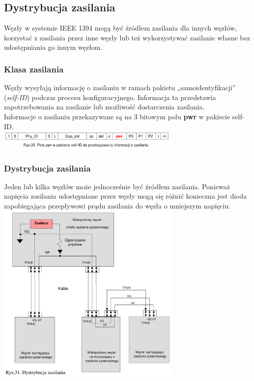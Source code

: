 \subsection{Dystrybucja zasilania}
Węzły w systemie IEEE 1394 mogą być źródłem zasilania dla innych węzłów, korzystać z zasilania przez inne węzły lub też wykorzystywać zasilanie własne bez udostępniania go innym węzłom.\\
\subsubsection{Klasa zasilania}
Węzły wysyłają informację o zasilaniu w ramach pakietu „samoidentyfikacji” (\emph{self-ID}) podczas procesu konfiguracyjnego. Informacja ta przedstawia zapotrzebowania na zasilanie lub możliwość dostarczenia zasilania.\\
Informacje o zasilaniu przekazywane są na 3 bitowym polu \textbf{pwr} w pakiecie self-ID.\\
\includegraphics[width=9cm]{./wyklady/FIREWIRE_32_1.pdf}
\subsubsection{Dystrybucja zasilania}
Jeden lub kilka węzłów może jednocześnie być źródłem zasilania. Ponieważ napięcia zasilania udostępniane przez węzły mogą się różnić konieczna jest dioda zapobiegająca przepływowi prądu zasilania do węzła o mniejszym napięciu.\\
\includegraphics[width=9cm]{./wyklady/FIREWIRE_33_1.pdf}



